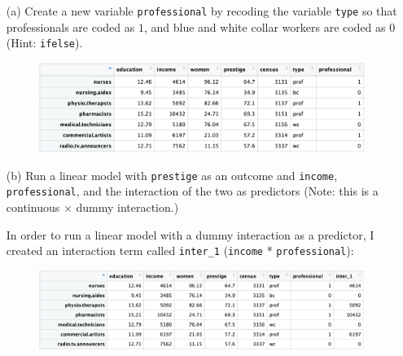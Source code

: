 \documentclass[12pt,letterpaper]{article}
\begin{document}
\begin{enumerate}
	\vspace{.5cm}
	
	\item [(a)]
	Create a new variable \texttt{professional} by recoding the variable \texttt{type} so that professionals are coded as $1$, and blue and white collar workers are coded as $0$ (Hint: \texttt{ifelse}).
		\vspace{.5cm}
	
		  
		
		\begin{figure}[h!]
			\centering
			\includegraphics[width=\textwidth]{professionals_column.png}
		\end{figure}
		
	
\newpage
	
	
	\item [(b)]
	Run a linear model with \texttt{prestige} as an outcome and \texttt{income}, \texttt{professional}, and the interaction of the two as predictors (Note: this is a continuous $\times$ dummy interaction.)
		\vspace{.03cm}
		
		In order to run a linear model with a dummy interaction as a predictor, I created an interaction term called \texttt{inter\_1} (\texttt{income} * \texttt{professional}):
			\vspace{.1cm}
	  
		\begin{figure}[h!]
			\centering
			\includegraphics[width=\textwidth]{inter_1_column.png}
		\end{figure}
	
	\vspace{.4cm}
	

\end{enumerate}
\end{document}
